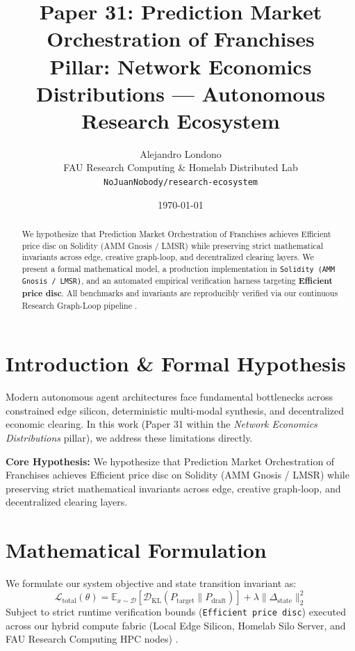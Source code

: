 \documentclass[10pt,twocolumn]{article}
\title{\textbf{Paper 31: Prediction Market Orchestration of Franchises}\\
\large Pillar: Network Economics Distributions --- Autonomous Research Ecosystem}
\author{
  Alejandro Londono \\
  FAU Research Computing \& Homelab Distributed Lab \\
  \texttt{NoJuanNobody/research-ecosystem}
}
\date{\today}
\begin{document}
\maketitle

\begin{abstract}
We hypothesize that Prediction Market Orchestration of Franchises achieves Efficient price disc on Solidity (AMM Gnosis / LMSR) while preserving strict mathematical invariants across edge, creative graph-loop, and decentralized clearing layers.
We present a formal mathematical model, a production implementation in \texttt{Solidity (AMM Gnosis / LMSR)}, and an automated empirical verification harness targeting \textbf{Efficient price disc}. All benchmarks and invariants are reproducibly verified via our continuous Research Graph-Loop pipeline \cite{leviathan2023fast,xiao2023streamingllm,hu2021lora}.
\end{abstract}

\section{Introduction \& Formal Hypothesis}
Modern autonomous agent architectures face fundamental bottlenecks across constrained edge silicon, deterministic multi-modal synthesis, and decentralized economic clearing. In this work (Paper 31 within the \textit{Network Economics Distributions} pillar), we address these limitations directly.

\textbf{Core Hypothesis:} We hypothesize that Prediction Market Orchestration of Franchises achieves Efficient price disc on Solidity (AMM Gnosis / LMSR) while preserving strict mathematical invariants across edge, creative graph-loop, and decentralized clearing layers.

\section{Mathematical Formulation}
We formulate our system objective and state transition invariant as:
\begin{equation}
\mathcal{L}_{\text{total}}(\theta) = \mathbb{E}_{x \sim \mathcal{D}}\left[\mathcal{D}_{\text{KL}}(P_{\text{target}} \parallel P_{\text{draft}})\right] + \lambda \|\Delta_{\text{state}}\|_2^2
\end{equation}
Subject to strict runtime verification bounds (\texttt{Efficient price disc}) executed across our hybrid compute fabric (Local Edge Silicon, Homelab Silo Server, and FAU Research Computing HPC nodes) \cite{rafailov2023dpo,shapley1953value,hanson2003combinatorial}.
\end{document}
